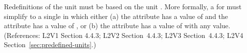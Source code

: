 Redefinitions of the  unit  must be based on
the unit
.  More formally, a \UnitDefinition for  must
simplify to a single \Unit in which either (a) the 
attribute has a value of  and the 
attribute has a value of , or (b) the 
attribute has a value of  with any
 value.  (References: L2V1 Section 4.4.3; L2V2
Section~4.4.3; L2V3 Section~4.4.3; L2V4 Section~\ref{sec:predefined-units}.)
